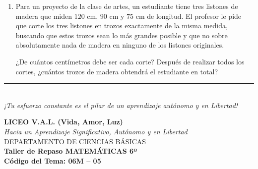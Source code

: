 \documentclass[12pt, letterpaper]{article}
\begin{document}
\begin{enumerate}[itemsep=0.8cm]
		Si las tres rutas salieron juntas por primera vez a las 6:00 a.m., responde:
		\begin{enumerate}[label=\alph*., itemsep=0.2cm, topsep=0.2cm]
			\item ¿Cuántos minutos mínimos deben transcurrir para que los tres autobuses vuelvan a coincidir al mismo tiempo en la estación?
			\item ¿A qué hora exacta ocurrirá este nuevo encuentro?
		\end{enumerate}
		
		\item Para un proyecto de la clase de artes, un estudiante tiene tres listones de madera que miden $120\text{ cm}$, $90\text{ cm}$ y $75\text{ cm}$ de longitud. El profesor le pide que corte los tres listones en trozos exactamente de la misma medida, buscando que estos trozos sean lo más grandes posible y que no sobre absolutamente nada de madera en ninguno de los listones originales. 
		
		¿De cuántos centímetros debe ser cada corte? Después de realizar todos los cortes, ¿cuántos trozos de madera obtendrá el estudiante en total?
		
	\end{enumerate}
	
	\vfill
	\begin{center}
		\rule{0.5\textwidth}{0.4pt} \\
		\vspace{0.2cm}
		\textit{¡Tu esfuerzo constante es el pilar de un aprendizaje autónomo y en Libertad!}
	\end{center}
	
	\newpage
	
	\begin{center}
		{\Large \textbf{LICEO V.A.L. (Vida, Amor, Luz)}}\\[0.1cm]
		{\normalsize \textit{Hacia un Aprendizaje Significativo, Autónomo y en Libertad}}\\[0.2cm]
		{\large DEPARTAMENTO DE CIENCIAS BÁSICAS}\\[0.1cm]
		\textbf{Taller de Repaso MATEMÁTICAS 6º}\\[0.1cm]
		\textbf{Código del Tema: 06M – 05}\\[0.1cm]
	\end{center}
	
\end{document}
